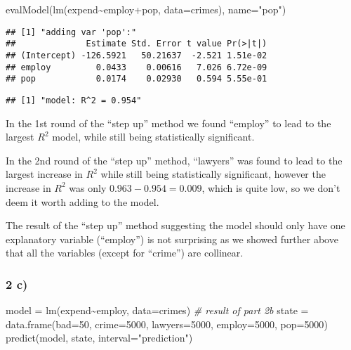 \documentclass[
  11pt,
]{article}
\newenvironment{Shaded}{\begin{snugshade}}{\end{snugshade}}
\newcommand{\AttributeTok}[1]{\textcolor[rgb]{0.77,0.63,0.00}{#1}}
\newcommand{\CommentTok}[1]{\textcolor[rgb]{0.56,0.35,0.01}{\textit{#1}}}
\newcommand{\DecValTok}[1]{\textcolor[rgb]{0.00,0.00,0.81}{#1}}
\newcommand{\FunctionTok}[1]{\textcolor[rgb]{0.00,0.00,0.00}{#1}}
\newcommand{\NormalTok}[1]{#1}
\newcommand{\OtherTok}[1]{\textcolor[rgb]{0.56,0.35,0.01}{#1}}
\newcommand{\SpecialCharTok}[1]{\textcolor[rgb]{0.00,0.00,0.00}{#1}}
\newcommand{\StringTok}[1]{\textcolor[rgb]{0.31,0.60,0.02}{#1}}
\begin{document}
\begin{Shaded}
\begin{Highlighting}[]
\FunctionTok{evalModel}\NormalTok{(}\FunctionTok{lm}\NormalTok{(expend}\SpecialCharTok{\textasciitilde{}}\NormalTok{employ}\SpecialCharTok{+}\NormalTok{pop, }\AttributeTok{data=}\NormalTok{crimes), }\AttributeTok{name=}\StringTok{"pop"}\NormalTok{)}
\end{Highlighting}
\end{Shaded}

\begin{verbatim}
## [1] "adding var 'pop':"
##              Estimate Std. Error t value Pr(>|t|)
## (Intercept) -126.5921   50.21637  -2.521 1.51e-02
## employ         0.0433    0.00616   7.026 6.72e-09
## pop            0.0174    0.02930   0.594 5.55e-01
\end{verbatim}

\begin{verbatim}
## [1] "model: R^2 = 0.954"
\end{verbatim}

In the 1st round of the ``step up'' method we found ``employ'' to lead
to the largest \(R^2\) model, while still being statistically
significant.

In the 2nd round of the ``step up'' method, ``lawyers'' was found to
lead to the largest increase in \(R^2\) while still being statistically
significant, however the increase in \(R^2\) was only
\(0.963-0.954=0.009\), which is quite low, so we don't deem it worth
adding to the model.

The result of the ``step up'' method suggesting the model should only
have one explanatory variable (``employ'') is not surprising as we
showed further above that all the variables (except for ``crime'') are
collinear.

\hypertarget{c-1}{%
\subsubsection{2 c)}\label{c-1}}

\begin{Shaded}
\begin{Highlighting}[]
\NormalTok{model }\OtherTok{=} \FunctionTok{lm}\NormalTok{(expend}\SpecialCharTok{\textasciitilde{}}\NormalTok{employ, }\AttributeTok{data=}\NormalTok{crimes) }\CommentTok{\# result of part 2b}
\NormalTok{state }\OtherTok{=} \FunctionTok{data.frame}\NormalTok{(}\AttributeTok{bad=}\DecValTok{50}\NormalTok{, }\AttributeTok{crime=}\DecValTok{5000}\NormalTok{, }\AttributeTok{lawyers=}\DecValTok{5000}\NormalTok{, }\AttributeTok{employ=}\DecValTok{5000}\NormalTok{, }\AttributeTok{pop=}\DecValTok{5000}\NormalTok{)}
\FunctionTok{predict}\NormalTok{(model, state, }\AttributeTok{interval=}\StringTok{"prediction"}\NormalTok{)}
\end{Highlighting}
\end{Shaded}
\end{document}
